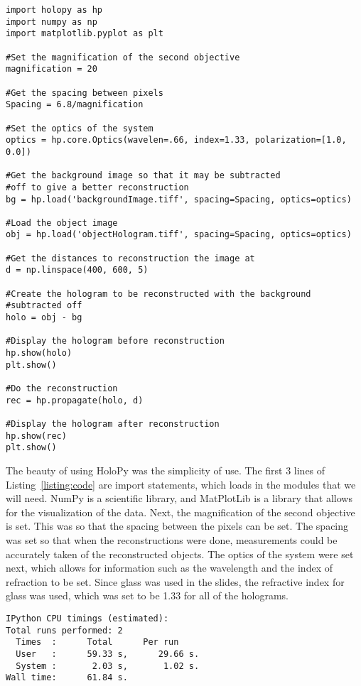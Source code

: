 \begin{Code}[scale=0.75,htbp!]
    \centering
\begin{lstlisting}[caption=Code for a general reconstruction, label=listing:code]
import holopy as hp
import numpy as np
import matplotlib.pyplot as plt

#Set the magnification of the second objective
magnification = 20

#Get the spacing between pixels
Spacing = 6.8/magnification

#Set the optics of the system
optics = hp.core.Optics(wavelen=.66, index=1.33, polarization=[1.0, 0.0])

#Get the background image so that it may be subtracted 
#off to give a better reconstruction
bg = hp.load('backgroundImage.tiff', spacing=Spacing, optics=optics)

#Load the object image
obj = hp.load('objectHologram.tiff', spacing=Spacing, optics=optics)

#Get the distances to reconstruction the image at
d = np.linspace(400, 600, 5)

#Create the hologram to be reconstructed with the background 
#subtracted off
holo = obj - bg

#Display the hologram before reconstruction
hp.show(holo)
plt.show()

#Do the reconstruction
rec = hp.propagate(holo, d)

#Display the hologram after reconstruction
hp.show(rec)
plt.show()

\end{lstlisting}
\end{Code}

The beauty of using HoloPy was the simplicity of use. The first 3
lines of Listing~\ref{listing:code} are import statements, which loads in the
modules that we will need. NumPy is a scientific library, and MatPlotLib is a
library that allows for the visualization of the data. Next, the magnification
of the second objective is set. This was so that the spacing between the
pixels can be set.
The spacing was set so that when the reconstructions were done, measurements
could
be accurately taken of the reconstructed objects. The optics of the system were
set next, which allows for information such as the wavelength and the index of
refraction to be set. Since glass was used in the slides, the refractive index
for glass was used, which was set to be 1.33 for all of the holograms.

\begin{Code}[scale=0.75,htbp!]
    \centering
\begin{lstlisting}[caption=Timing of a typical run of the code,
label=listing:time]
IPython CPU timings (estimated):
Total runs performed: 2
  Times  :      Total      Per run
  User   :      59.33 s,      29.66 s.
  System :       2.03 s,       1.02 s.
Wall time:      61.84 s.
\end{lstlisting}
\end{Code}

